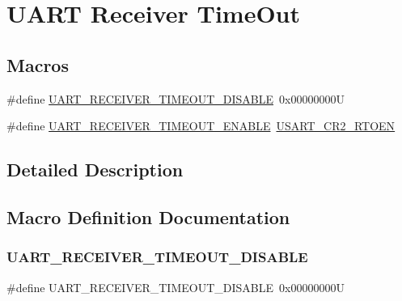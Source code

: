 \hypertarget{group___u_a_r_t___receiver___time_out}{}\section{U\+A\+RT Receiver Time\+Out}
\label{group___u_a_r_t___receiver___time_out}
\subsection*{Macros}
\begin{DoxyCompactItemize}
\item 
\#define \mbox{\hyperlink{group___u_a_r_t___receiver___time_out_ga575c43813df656b21dc39aff6a968046}{U\+A\+R\+T\+\_\+\+R\+E\+C\+E\+I\+V\+E\+R\+\_\+\+T\+I\+M\+E\+O\+U\+T\+\_\+\+D\+I\+S\+A\+B\+LE}}~0x00000000U
\item 
\#define \mbox{\hyperlink{group___u_a_r_t___receiver___time_out_ga6e25985f0dacc3e79ae552746952ac18}{U\+A\+R\+T\+\_\+\+R\+E\+C\+E\+I\+V\+E\+R\+\_\+\+T\+I\+M\+E\+O\+U\+T\+\_\+\+E\+N\+A\+B\+LE}}~\mbox{\hyperlink{group___peripheral___registers___bits___definition_gab89524eda63950f55bc47208a66b7dca}{U\+S\+A\+R\+T\+\_\+\+C\+R2\+\_\+\+R\+T\+O\+EN}}
\end{DoxyCompactItemize}


\subsection{Detailed Description}


\subsection{Macro Definition Documentation}
\mbox{\label{group___u_a_r_t___receiver___time_out_ga575c43813df656b21dc39aff6a968046}} 
\subsubsection{\texorpdfstring{UART\_RECEIVER\_TIMEOUT\_DISABLE}{UART\_RECEIVER\_TIMEOUT\_DISABLE}}
{\footnotesize\ttfamily \#define U\+A\+R\+T\+\_\+\+R\+E\+C\+E\+I\+V\+E\+R\+\_\+\+T\+I\+M\+E\+O\+U\+T\+\_\+\+D\+I\+S\+A\+B\+LE~0x00000000U}

